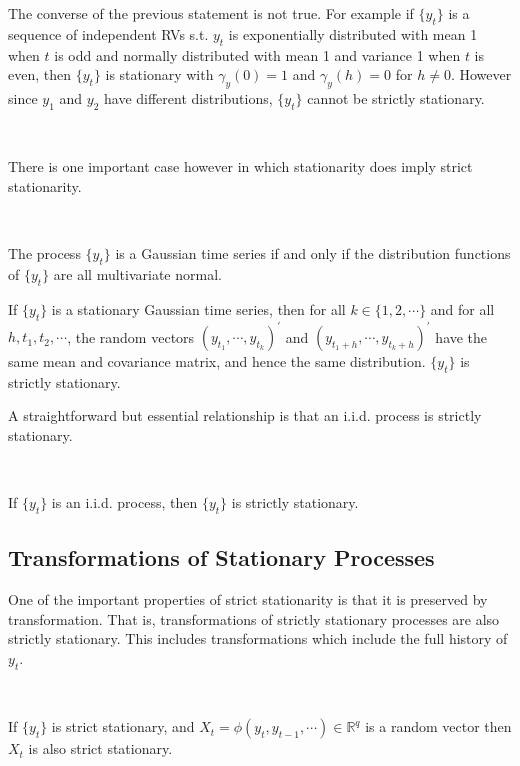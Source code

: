 The converse of the previous statement is not true. For example if $\{y_t\}$ is a sequence
of independent RVs s.t. $y_t$ is exponentially distributed with mean 1 when $t$ is odd
and normally distributed with mean 1 and variance 1 when $t$ is even, then $\{y_t\}$ is stationary
with $\gamma_y(0)=1$ and $\gamma_y(h) = 0$ for $h \neq 0$. However since $y_1$ and $y_2$ have different distributions,
$\{y_t\}$ cannot be strictly stationary.

\begin{note}
    \

    There is one important case however in which stationarity does imply strict stationarity.
\end{note}

\begin{definition}\label{def:gaussian-time-series}
    \

    The process $\{y_t\}$ is a Gaussian time series if and only if the distribution functions of $\{y_t\}$ are all multivariate normal.
\end{definition}
If $\{y_t\}$ is a stationary Gaussian time series, then for all $k \in \{1, 2, \cdots\}$ and for all $h, t_1, t_2, \cdots$,
the random vectors $(y_{t_1}, \cdots, y_{t_k})^{\prime}$ and $(y_{t_1 + h}, \cdots, y_{t_k + h})^{\prime} $
have the same mean and covariance matrix, and hence the same distribution. $\{y_t\}$ is strictly stationary.

A straightforward but essential relationship is that an i.i.d. process is strictly stationary.
\begin{theorem}\label{thm:iid-stationary}
    \

    If $\{y_t\}$ is an i.i.d. process, then $\{y_t\}$ is strictly stationary.
\end{theorem}

\subsection{Transformations of Stationary Processes}
One of the important properties of strict stationarity is that it is preserved by transformation. That is,
transformations of strictly stationary processes are also strictly stationary. This includes transformations
which include the full history of $y_t$.
\begin{theorem}\label{thm:transformation-invariance}
    \

    If $\{y_t\}$ is strict stationary, and $X_t = \phi (y_t, y_{t-1}, \cdots) \in \mathbb{R}^q$ is a random vector
    then $X_t$ is also strict stationary.   
\end{theorem}

